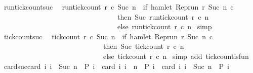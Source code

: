 \begin{isabellebody}
%
\endisadelimproof
\isanewline
{}\isamarkupfalse%
\ run{\isacharunderscore}tick{\isacharunderscore}count{\isacharunderscore}suc{\isacharcolon}\isanewline
\ \ {\isacartoucheopen}run{\isacharunderscore}tick{\isacharunderscore}count\ r\ c\ {\isacharparenleft}Suc\ n{\isacharparenright}\ {\isacharequal}\ {\isacharparenleft}if\ hamlet\ {\isacharparenleft}{\isacharparenleft}Rep{\isacharunderscore}run\ r{\isacharparenright}\ {\isacharparenleft}Suc\ n{\isacharparenright}\ c{\isacharparenright}\isanewline
\ \ \ \ \ \ \ \ \ \ \ \ \ \ \ \ \ \ \ \ \ \ \ \ \ \ \ \ \ \ \ \ \ then\ Suc\ {\isacharparenleft}run{\isacharunderscore}tick{\isacharunderscore}count\ r\ c\ n{\isacharparenright}\isanewline
\ \ \ \ \ \ \ \ \ \ \ \ \ \ \ \ \ \ \ \ \ \ \ \ \ \ \ \ \ \ \ \ \ else\ run{\isacharunderscore}tick{\isacharunderscore}count\ r\ c\ n{\isacharparenright}{\isacartoucheclose}\isanewline
%
\isadelimproof
%
\endisadelimproof
%
\isatagproof
{}\isamarkupfalse%
\ simp%
\endisatagproof
{\isafoldproof}%
%
\isadelimproof
\isanewline
%
\endisadelimproof
\isanewline
{}\isamarkupfalse%
\ tick{\isacharunderscore}count{\isacharunderscore}suc{\isacharcolon}\isanewline
\ \ {\isacartoucheopen}tick{\isacharunderscore}count\ r\ c\ {\isacharparenleft}Suc\ n{\isacharparenright}\ {\isacharequal}\ {\isacharparenleft}if\ hamlet\ {\isacharparenleft}{\isacharparenleft}Rep{\isacharunderscore}run\ r{\isacharparenright}\ {\isacharparenleft}Suc\ n{\isacharparenright}\ c{\isacharparenright}\isanewline
\ \ \ \ \ \ \ \ \ \ \ \ \ \ \ \ \ \ \ \ \ \ \ \ \ \ \ \ \ then\ Suc\ {\isacharparenleft}tick{\isacharunderscore}count\ r\ c\ n{\isacharparenright}\isanewline
\ \ \ \ \ \ \ \ \ \ \ \ \ \ \ \ \ \ \ \ \ \ \ \ \ \ \ \ \ else\ tick{\isacharunderscore}count\ r\ c\ n{\isacharparenright}{\isacartoucheclose}\isanewline
%
\isadelimproof
%
\endisadelimproof
%
\isatagproof
{}\isamarkupfalse%
\ {\isacharparenleft}simp\ add{\isacharcolon}\ tick{\isacharunderscore}count{\isacharunderscore}is{\isacharunderscore}fun{\isacharparenright}%
\endisatagproof
{\isafoldproof}%
%
\isadelimproof
\isanewline
%
\endisadelimproof
\isanewline
{}\isamarkupfalse%
\ card{\isacharunderscore}suc{\isacharcolon}{\isacartoucheopen}card\ {\isacharbraceleft}i{\isachardot}\ i\ {\isasymle}\ {\isacharparenleft}Suc\ n{\isacharparenright}\ {\isasymand}\ P\ i{\isacharbraceright}\ {\isacharequal}\ card\ {\isacharbraceleft}i{\isachardot}\ i\ {\isasymle}\ n\ {\isasymand}\ P\ i{\isacharbraceright}\ {\isacharplus}\ card\ {\isacharbraceleft}i{\isachardot}\ i\ {\isacharequal}\ {\isacharparenleft}Suc\ n{\isacharparenright}\ {\isasymand}\ P\ i{\isacharbraceright}{\isacartoucheclose}\isanewline

\end{isabellebody}
